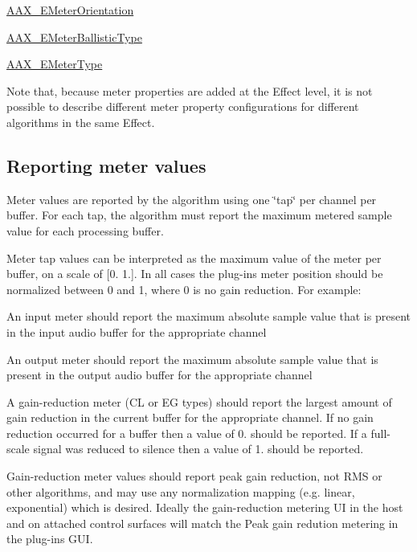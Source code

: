 \begin{DoxyItemize}
\item \mbox{\hyperlink{a00491_af260f0f9a6bff0f7bfd3200b2947c96b}{A\+A\+X\+\_\+\+E\+Meter\+Orientation}} \item \mbox{\hyperlink{a00491_a9aaedbe356691c4e4584fa7ccdbcc776}{A\+A\+X\+\_\+\+E\+Meter\+Ballistic\+Type}} \item \mbox{\hyperlink{a00491_a590815545eaf0d3be0bb8f656fe2a761}{A\+A\+X\+\_\+\+E\+Meter\+Type}}\end{DoxyItemize}
Note that, because meter properties are added at the Effect level, it is not possible to describe different meter property configurations for different algorithms in the same Effect.\hypertarget{a00807_AdditionalFeatures_Meters_reporting}{}\subsection{Reporting meter values}\label{a00807_AdditionalFeatures_Meters_reporting}
Meter values are reported by the algorithm using one \char`\"{}tap\char`\"{} per channel per buffer. For each tap, the algorithm must report the maximum metered sample value for each processing buffer.

Meter tap values can be interpreted as the maximum value of the meter per buffer, on a scale of \mbox{[}0. 1.\mbox{]}. In all cases the plug-\/in\textquotesingle{}s meter position should be normalized between 0 and 1, where 0 is no gain reduction. For example\+:

\begin{DoxyItemize}
\item An input meter should report the maximum absolute sample value that is present in the input audio buffer for the appropriate channel \item An output meter should report the maximum absolute sample value that is present in the output audio buffer for the appropriate channel \item A gain-\/reduction meter (CL or EG types) should report the largest amount of gain reduction in the current buffer for the appropriate channel. If no gain reduction occurred for a buffer then a value of 0. should be reported. If a full-\/scale signal was reduced to silence then a value of 1. should be reported.\end{DoxyItemize}
Gain-\/reduction meter values should report peak gain reduction, not R\+MS or other algorithms, and may use any normalization mapping (e.\+g. linear, exponential) which is desired. Ideally the gain-\/reduction metering UI in the host and on attached control surfaces will match the Peak gain redution metering in the plug-\/in\textquotesingle{}s G\+UI.

